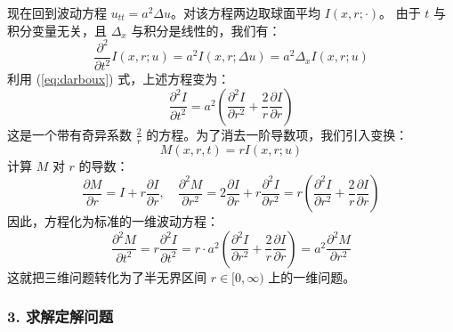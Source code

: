 \documentclass[12pt,a4paper]{ctexart}
\begin{document}
	现在回到波动方程 $u_{tt} = a^2 \Delta u$。对该方程两边取球面平均 $I(x,r;\cdot)$。
	由于 $t$ 与积分变量无关，且 $\Delta_x$ 与积分是线性的，我们有：
	\[
	\dfrac{\partial^2}{\partial t^2} I(x,r;u) = a^2 I(x,r;\Delta u) = a^2 \Delta_x I(x,r;u)
	\]
	利用 (\ref{eq:darboux}) 式，上述方程变为：
	\[
	\dfrac{\partial^2 I}{\partial t^2} = a^2 \left( \dfrac{\partial^2 I}{\partial r^2} + \dfrac{2}{r} \dfrac{\partial I}{\partial r} \right)
	\]
	这是一个带有奇异系数 $\frac{2}{r}$ 的方程。为了消去一阶导数项，我们引入变换：
	\begin{equation}
		M(x,r,t) = r I(x,r;u)
	\end{equation}
	计算 $M$ 对 $r$ 的导数：
	\[
	\dfrac{\partial M}{\partial r} = I + r \dfrac{\partial I}{\partial r}, \quad \dfrac{\partial^2 M}{\partial r^2} = 2\dfrac{\partial I}{\partial r} + r \dfrac{\partial^2 I}{\partial r^2} = r \left( \dfrac{\partial^2 I}{\partial r^2} + \dfrac{2}{r}\dfrac{\partial I}{\partial r} \right)
	\]
	因此，方程化为标准的一维波动方程：
	\begin{equation}
		\dfrac{\partial^2 M}{\partial t^2} = r \dfrac{\partial^2 I}{\partial t^2} = r \cdot a^2 \left( \dfrac{\partial^2 I}{\partial r^2} + \dfrac{2}{r} \dfrac{\partial I}{\partial r} \right) = a^2 \dfrac{\partial^2 M}{\partial r^2}
	\end{equation}
	这就把三维问题转化为了半无界区间 $r \in [0, \infty)$ 上的一维问题。
	
	\subsubsection*{3. 求解定解问题}
	
\end{document}
